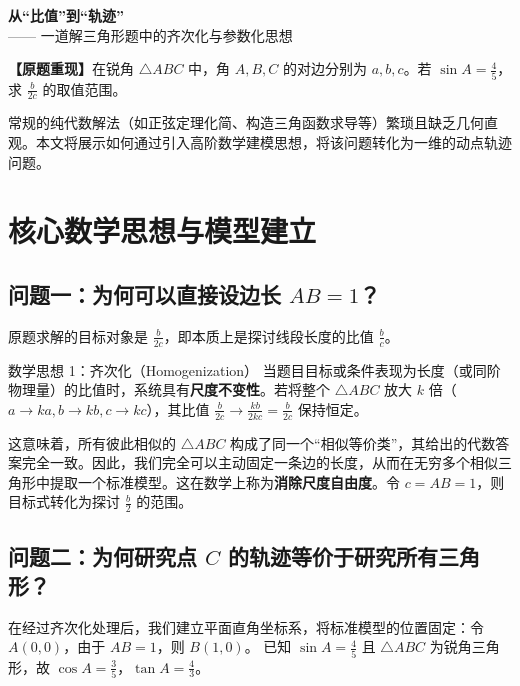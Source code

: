\documentclass[11pt, a4paper]{ctexart}
\begin{document}
\begin{center}
    {\sffamily \Huge \textbf{从“比值”到“轨迹”}} \\
    \vspace{0.3em}
    {\sffamily \Large —— 一道解三角形题中的齐次化与参数化思想}
\end{center}

\vspace{0.1cm}

\begin{tcolorbox}[blanker, borderline north={1pt}{0pt}{black}, borderline south={1pt}{0pt}{black}, top=2mm, bottom=2mm, before skip=0.2em, after skip=0.4em]
\textbf{【原题重现】}在锐角 $\triangle ABC$ 中，角 $A, B, C$ 的对边分别为 $a, b, c$。若 $\sin A = \frac{4}{5}$，求 $\frac{b}{2c}$ 的取值范围。
\end{tcolorbox}

常规的纯代数解法（如正弦定理化简、构造三角函数求导等）繁琐且缺乏几何直观。本文将展示如何通过引入高阶数学建模思想，将该问题转化为一维的动点轨迹问题。

\section{核心数学思想与模型建立}

\subsection{问题一：为何可以直接设边长 $AB = 1$？}
原题求解的目标对象是 $\frac{b}{2c}$，即本质上是探讨线段长度的比值 $\frac{b}{c}$。

\begin{conceptbox}{数学思想 1：齐次化（Homogenization）}
当题目目标或条件表现为长度（或同阶物理量）的比值时，系统具有\textbf{尺度不变性}。若将整个 $\triangle ABC$ 放大 $k$ 倍（$a\to ka, b\to kb, c\to kc$），其比值 $\frac{b}{2c} \to \frac{kb}{2kc} = \frac{b}{2c}$ 保持恒定。
\end{conceptbox}

这意味着，所有彼此相似的 $\triangle ABC$ 构成了同一个“相似等价类”，其给出的代数答案完全一致。因此，我们完全可以主动固定一条边的长度，从而在无穷多个相似三角形中提取一个标准模型。这在数学上称为\textbf{消除尺度自由度}。令 $c = AB = 1$，则目标式转化为探讨 $\frac{b}{2}$ 的范围。

\subsection{问题二：为何研究点 $C$ 的轨迹等价于研究所有三角形？}
在经过齐次化处理后，我们建立平面直角坐标系，将标准模型的位置固定：令 $A(0,0)$，由于 $AB=1$，则 $B(1,0)$。
已知 $\sin A = \frac{4}{5}$ 且 $\triangle ABC$ 为锐角三角形，故 $\cos A = \frac{3}{5}$，$\tan A = \frac{4}{3}$。
\end{document}

